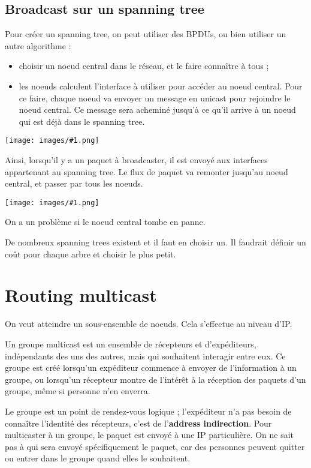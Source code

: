 \documentclass[10pt,a4paper]{report}
\newcommand{\dessin}[1]{\begin{center}\texttt{[image: images/\#1.png]}\end{center}}
\begin{document}
	
		\subsection{Broadcast sur un spanning tree}
		
		Pour créer un spanning tree, on peut utiliser des BPDUs, ou bien utiliser un autre algorithme :
	
		\begin{itemize}
			\item choisir un noeud central dans le réseau, et le faire connaître à tous ;
			\item les noeuds calculent l'interface à utiliser pour accéder au noeud central. Pour ce faire, chaque noeud va envoyer un message en unicast pour rejoindre le noeud central. Ce message sera acheminé jusqu'à ce qu'il arrive à un noeud qui est déjà dans le spanning tree.
		\end{itemize}
		
		\dessin{5}
	
		Ainsi, lorsqu'il y a un paquet à broadcaster, il est envoyé aux interfaces appartenant au spanning tree. Le flux de paquet va remonter jusqu'au noeud central, et passer par tous les noeuds.	
	
		\dessin{4}
	
		On a un problème si le noeud central tombe en panne.
	
		De nombreux spanning trees existent et il faut en choisir un. Il faudrait définir un coût pour chaque arbre et choisir le plus petit.
	
	\section{Routing multicast}
	
	On veut atteindre un sous-ensemble de noeuds. Cela s'effectue au niveau d'IP.
	
	Un groupe multicast est un ensemble de récepteurs et d'expéditeurs, indépendants des uns des autres, mais qui souhaitent interagir entre eux. Ce groupe est créé lorsqu'un expéditeur commence à envoyer de l'information à un groupe, ou lorsqu'un récepteur montre de l'intérêt à la réception des paquets d'un groupe, même si personne n'en enverra.
	
	Le groupe est un point de rendez-vous logique ; l'expéditeur n'a pas besoin de connaître l'identité des récepteurs, c'est de l'\textbf{address indirection}. Pour multicaster à un groupe, le paquet est envoyé à une IP particulière. On ne sait pas à qui sera envoyé spécifiquement le paquet, car des personnes peuvent quitter ou entrer dans le groupe quand elles le souhaitent.
	
\end{document}
